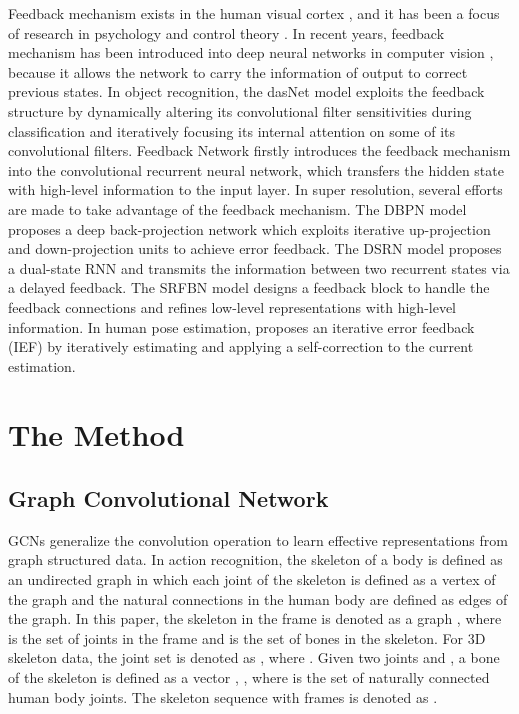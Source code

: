 \documentclass[runningheads]{llncs}
\begin{document}
Feedback mechanism exists in the human visual cortex \cite{hupe1998cortical,gilbert2007brain}, and it has been a focus of research in psychology \cite{ashford1983feedback} and control theory \cite{lee1967foundations,parlos1994application}. In recent years, feedback mechanism has been introduced into deep neural networks in computer vision \cite{stollenga2014deep,zamir2017feedback,li2019feedback,haris2018deep,han2018image,carreira2016human}, because it allows the network to carry the information of output to correct previous states.
In object recognition, the dasNet model \cite{stollenga2014deep} exploits the feedback structure by dynamically altering its convolutional filter sensitivities during classification and iteratively focusing its internal attention on some of its convolutional filters. Feedback Network \cite{zamir2017feedback} firstly introduces the feedback mechanism into the convolutional recurrent neural network, which transfers the hidden state with high-level information to the input layer.
In super resolution, several efforts \cite{li2019feedback,haris2018deep,han2018image} are made to take advantage of the feedback mechanism. The DBPN model \cite{haris2018deep} proposes a deep back-projection network which exploits iterative up-projection and down-projection units to achieve error feedback. The DSRN model \cite{han2018image} proposes a dual-state RNN and transmits the information between two recurrent states via a delayed feedback. The SRFBN model \cite{li2019feedback} designs a feedback block to handle the feedback connections and refines low-level representations with high-level information.
In human pose estimation, \cite{carreira2016human} proposes an iterative error feedback (IEF) by iteratively estimating and applying a self-correction to the current estimation.

\vspace{-1mm}
\section{The Method}
\vspace{-1mm}
\subsection{Graph Convolutional Network}
\label{section_gcn}
GCNs generalize the convolution operation to learn effective representations from graph structured data. In action recognition, the skeleton of a body is defined as an undirected graph in which each joint of the skeleton is defined as a vertex of the graph and the natural connections in the human body are defined as edges of the graph. In this paper, the skeleton in the frame  is denoted as a graph , where  is the set of joints in the frame and  is the set of bones in the skeleton. For 3D skeleton data, the joint set is denoted as , where . Given two joints  and , a bone of the skeleton is defined as a vector , , where  is the set of naturally connected human body joints. The skeleton sequence with  frames is denoted as .
\end{document}
